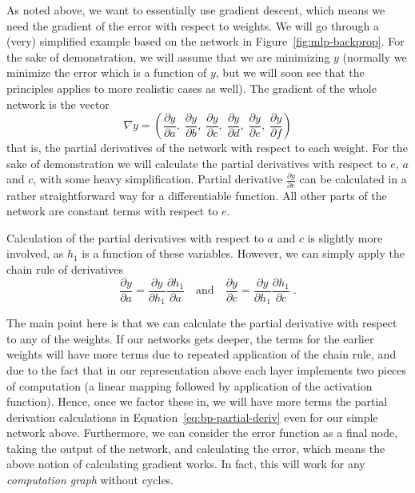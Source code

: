 As noted above,
we want to essentially use gradient descent,
which means we need the gradient of the error
with respect to weights.
We will go through a (very) simplified example
based on the network in Figure~\ref{fig:mlp-backprop}.
For the sake of demonstration,
we will assume that we are minimizing $y$
(normally we minimize the error which is a function of $y$,
but we will soon see that
the principles applies to more realistic cases as well).
The gradient of the whole network is the vector
\begin{equation*}
  \nabla{}y = \left(
                  \frac{\partial y}{\partial a},\;
                  \frac{\partial y}{\partial b},\;
                  \frac{\partial y}{\partial c},\;
                  \frac{\partial y}{\partial d},\;
                  \frac{\partial y}{\partial e},\;
                  \frac{\partial y}{\partial f}
              \right)
\end{equation*}
that is, the partial derivatives of the network
with respect to each weight.
For the sake of demonstration we will calculate the  
partial derivatives with respect to $e$, $a$ and $c$,
with some heavy simplification.
Partial derivative $\frac{\partial y}{\partial e}$ can be calculated
in a rather straightforward way for a differentiable function.
All other parts of the network are constant terms with respect to $e$.

Calculation of the partial derivatives with respect to 
$a$ and $c$ is slightly more involved,
as $h_{1}$ is a function of these variables.
However, we can simply apply the chain rule of derivatives%
\begin{equation}\label{eq:bp-partial-deriv}
      \frac{\partial y}{\partial a} = 
      \frac{\partial y}{\partial h_{1}}
      \frac{\partial h_{1}}{\partial a}
    \quad\text{and}\quad
      \frac{\partial y}{\partial c} = 
      \frac{\partial y}{\partial h_{1}}
      \frac{\partial h_{1}}{\partial c} \;.
\end{equation}

The main point here is that we can calculate the partial derivative
with respect to any of the weights.
If our networks gets deeper, the terms for the earlier weights 
will have more terms due to repeated application of the chain rule,
and due to the fact that in our representation above each layer
implements two pieces of computation
(a linear mapping followed by application of the activation function).
Hence, once we factor these in,
we will have more terms the partial derivation calculations
in Equation~\ref{eq:bp-partial-deriv} even for our simple network above.
Furthermore, we can consider the error function as a final node,
taking the output of the network, and calculating the error,
which means the above notion of calculating gradient works.
In fact, this will work for any \emph{computation graph} without cycles.

